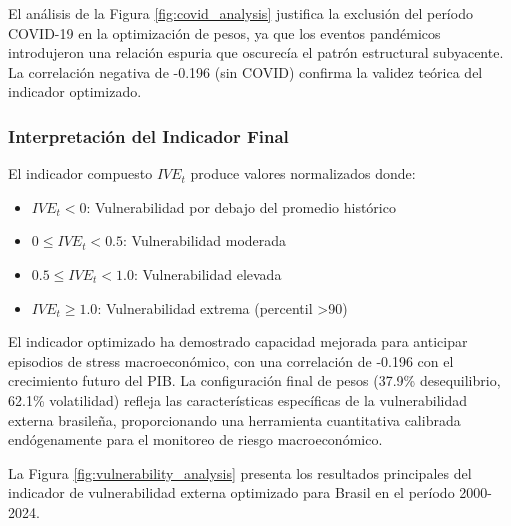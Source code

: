 \documentclass[3p,11pt]{elsarticle}
\begin{document}
El análisis de la Figura \ref{fig:covid_analysis} justifica la exclusión del período 
COVID-19 en la optimización de pesos, ya que los eventos pandémicos introdujeron una 
relación espuria que oscurecía el patrón estructural subyacente. La correlación negativa 
de -0.196 (sin COVID) confirma la validez teórica del indicador optimizado.


\subsubsection{Interpretación del Indicador Final}

El indicador compuesto $IVE_t$ produce valores normalizados donde:

\begin{itemize}
    \item \textbf{$IVE_t < 0$}: Vulnerabilidad por debajo del promedio histórico
    \item \textbf{$0 \leq IVE_t < 0.5$}: Vulnerabilidad moderada
    \item \textbf{$0.5 \leq IVE_t < 1.0$}: Vulnerabilidad elevada
    \item \textbf{$IVE_t \geq 1.0$}: Vulnerabilidad extrema (percentil >90)
\end{itemize}

El indicador optimizado ha demostrado capacidad mejorada para anticipar episodios de stress macroeconómico, con una correlación de -0.196 con el crecimiento futuro del PIB. La configuración final de pesos (37.9\% desequilibrio, 62.1\% volatilidad) refleja las características específicas de la vulnerabilidad externa brasileña, proporcionando una herramienta cuantitativa calibrada endógenamente para el monitoreo de riesgo macroeconómico.

La Figura \ref{fig:vulnerability_analysis} presenta los resultados principales del indicador de vulnerabilidad externa optimizado para Brasil en el período 2000-2024.
\end{document}
